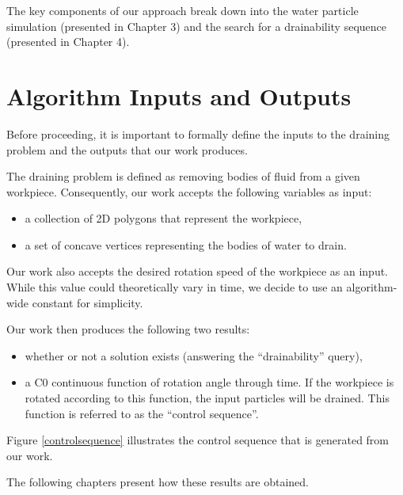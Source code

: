 The key components of our approach break down into the water particle simulation (presented in Chapter 3) and the search for a drainability sequence (presented in Chapter 4).

\section{Algorithm Inputs and Outputs}

Before proceeding, it is important to formally define the inputs to the draining problem and the outputs that our work produces.

The draining problem is defined as removing bodies of fluid from a given workpiece. Consequently, our work accepts the following variables as input:

\begin{itemize}
\item a collection of 2D polygons that represent the workpiece,
\item a set of concave vertices representing the bodies of water to drain.
\end{itemize}

Our work also accepts the desired rotation speed of the workpiece as an input. While this value could theoretically vary in time, we decide to use an algorithm-wide constant for simplicity.

Our work then produces the following two results:

\begin{itemize}
\item whether or not a solution exists (answering the ``drainability'' query),
\item a C0 continuous function of rotation angle through time. If the workpiece is rotated according to this function, the input particles will be drained. This function is referred to as the ``control sequence''.
\end{itemize}

Figure \ref{controlsequence} illustrates the control sequence that is generated from our work.


The following chapters present how these results are obtained.

